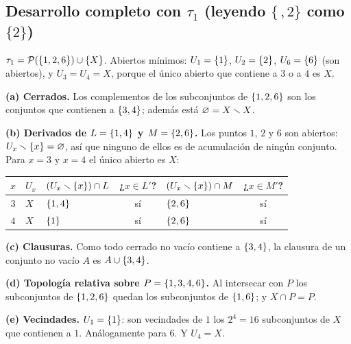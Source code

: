 \subsection{Desarrollo completo con \texorpdfstring{$\tau_1$}{tau1} (leyendo \texorpdfstring{$\{\,,2\}$}{\{,2\}} como \texorpdfstring{$\{2\}$}{\{2\}})}
$\tau_1=\mathcal{P}(\{1,2,6\})\cup\{X\}$. Abiertos mínimos: $U_1=\{1\}$, $U_2=\{2\}$, $U_6=\{6\}$ (son abiertos), y
$U_3=U_4=X$, porque el único abierto que contiene a $3$ o a $4$ es $X$.

\textbf{(a) Cerrados.} Los complementos de los subconjuntos de $\{1,2,6\}$ son los conjuntos que contienen a
$\{3,4\}$; además está $\varnothing=X\smallsetminus X$.

\textbf{(b) Derivados de $L=\{1,4\}$ y $M=\{2,6\}$.} Los puntos $1$, $2$ y $6$ son abiertos: $U_x\smallsetminus\{x\}=\varnothing$, así
que ninguno de ellos es de acumulación de ningún conjunto. Para $x=3$ y $x=4$ el único abierto es $X$:
\begin{center}\small\renewcommand{\arraystretch}{1.2}
\begin{tabular}{@{}cl|lc|lc@{}}\toprule
$x$ & $U_x$ & $(U_x\smallsetminus\{x\})\cap L$ & ¿$x\in L'$? & $(U_x\smallsetminus\{x\})\cap M$ & ¿$x\in M'$?\\ \midrule
$3$ & $X$ & $\{1,4\}$ & sí & $\{2,6\}$ & sí\\
$4$ & $X$ & $\{1\}$ & sí & $\{2,6\}$ & sí\\ \bottomrule
\end{tabular}\end{center}

\textbf{(c) Clausuras.} Como todo cerrado no vacío contiene a $\{3,4\}$, la clausura de un conjunto no vacío $A$ es
$A\cup\{3,4\}$.

\textbf{(d) Topología relativa sobre $P=\{1,3,4,6\}$.} Al intersecar con $P$ los subconjuntos de $\{1,2,6\}$ quedan
los subconjuntos de $\{1,6\}$; y $X\cap P=P$.

\textbf{(e) Vecindades.} $U_1=\{1\}$: son vecindades de $1$ los $2^4=16$ subconjuntos de $X$ que contienen a $1$.
Análogamente para $6$. Y $U_4=X$.


